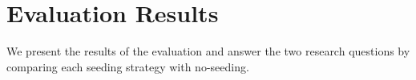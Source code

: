 
\section{Evaluation Results}
\label{sec:model_seeding:eval-results}



We present the results of the evaluation and answer the two research questions by comparing each seeding strategy with no-seeding.



%	


